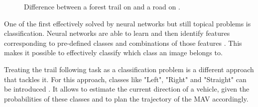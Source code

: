 \begin{figure}[H]
  \centering
  \caption{Difference between a forest trail on  and a road on .}
  \label{fig:features_difference}
\end{figure}

One of the first effectively solved by neural networks but still topical problems is classification. Neural networks are able to learn and then identify features corresponding to pre-defined classes and combinations of those features \cite{krizhevsky2012imagenet}. This makes it possible to effectively classify which class an image belongs to. 

Treating the trail following task as a classification problem is a different approach that tackles it. For this approach, classes like "Left", "Right" and "Straight" can be introduced \cite{giusti2016machine}. It allows to estimate the current direction of a vehicle, given the probabilities of these classes and to plan the trajectory of the \acs{MAV} accordingly. 


